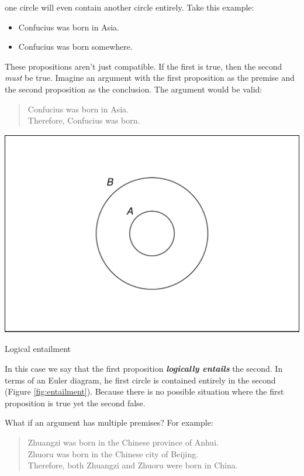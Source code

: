 \documentclass[justified]{tufte-book}
\providecommand{\tightlist}{%
  \setlength{\itemsep}{0pt}\setlength{\parskip}{0pt}}
\newenvironment{argument}{\begin{quote}\normalsize}{\end{quote}}
\theoremstyle{definition}
\theoremstyle{definition}
\theoremstyle{definition}
\theoremstyle{remark}
\begin{document}
 one circle will even contain another circle
entirely. Take this example:

\begin{itemize}
\tightlist
\item
  Confucius was born in Asia.
\item
  Confucius was born somewhere.
\end{itemize}

These propositions aren't just compatible. If the first is true, then
the second \emph{must} be true. Imagine an argument with the first
proposition as the premise and the second proposition as the conclusion.
The argument would be valid:

\begin{argument}
Confucius was born in Asia.\\
Therefore, Confucius was born.
\end{argument}

\begin{marginfigure}
\includegraphics{_main_files/figure-latex/entailment-1} \caption[Logical entailment]{Logical entailment}\label{fig:entailment}
\end{marginfigure}

In this case we say that the first proposition \textbf{\emph{logically
entails}} the second. In terms of an Euler diagram, he first circle is
contained entirely in the second (Figure \ref{fig:entailment}). Because
there is no possible situation where the first proposition is true yet
the second false.

What if an argument has multiple premises? For example:

\begin{argument}
Zhuangzi was born in the Chinese province of Anhui.\\
Zhuoru was born in the Chinese city of Beijing.\\
Therefore, both Zhuangzi and Zhuoru were born in China.
\end{argument}
\end{document}
